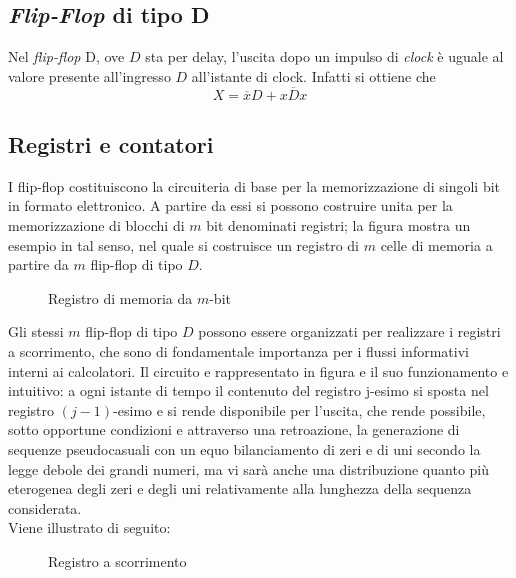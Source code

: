 \documentclass[a4paper]{extarticle}
\begin{document}
\subsection{\textit{Flip-Flop} di tipo D}
Nel \textit{flip-flop} D, ove \(D\) sta per delay, l'uscita dopo un impulso di \textit{clock} è uguale al valore presente all'ingresso \(D\) all'istante di clock. Infatti si ottiene che
\[X = \overline{x}D + x \overline{D}x\]

\subsection{Registri e contatori}
I flip-flop costituiscono la circuiteria di base per la memorizzazione di singoli bit in formato elettronico. A partire da essi si possono costruire unita per la memorizzazione di blocchi di \(m\) bit denominati registri; la figura mostra un esempio in tal senso, nel quale si costruisce un registro di \(m\) celle di memoria a partire da \(m\) flip-flop di tipo \(D\).

\begin{figure}[H]
    \centering
    \caption{Registro di memoria da \(m\)-bit}
    \label{fig:registro_di_memoria_da_m_bit}
\end{figure}

\noindent
Gli stessi \(m\) flip-flop di tipo \(D\) possono essere organizzati per realizzare i registri a scorrimento, che sono di fondamentale importanza per i flussi informativi interni ai calcolatori. Il circuito e rappresentato in figura e il suo funzionamento e intuitivo: a ogni istante di tempo il contenuto del registro j-esimo si sposta nel registro \((j - 1)\)-esimo e si rende disponibile per l’uscita, che rende possibile, sotto opportune condizioni e attraverso una retroazione, la generazione di sequenze pseudocasuali con un equo bilanciamento di zeri e di uni secondo la legge debole dei grandi numeri, ma vi sarà anche una distribuzione quanto più eterogenea degli zeri e degli uni relativamente alla lunghezza della sequenza considerata.\\
Viene illustrato di seguito:

\begin{figure}[H]
    \centering
    \caption{Registro a scorrimento}
    \label{fig:registro_scorrimento}
\end{figure}
\end{document}
